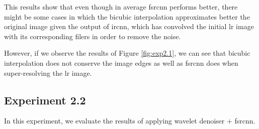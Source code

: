 This results show that even though in average \gls{fsrcnn} performs better, there might be some cases in which the bicubic interpolation approximates better the original image given the output of \gls{ircnn}, which has convolved the initial \gls{lr} image with its corresponding filers in order to remove the noise.

However, if we observe the results of Figure \ref{fig:exp2.1}, we can see that bicubic interpolation does not conserve the image edges as well as \gls{fsrcnn} does when super-resolving the \gls{lr} image.

\subsection{Experiment 2.2}
In this experiment, we evaluate the results of applying wavelet denoiser $+$ \gls{fsrcnn}.

